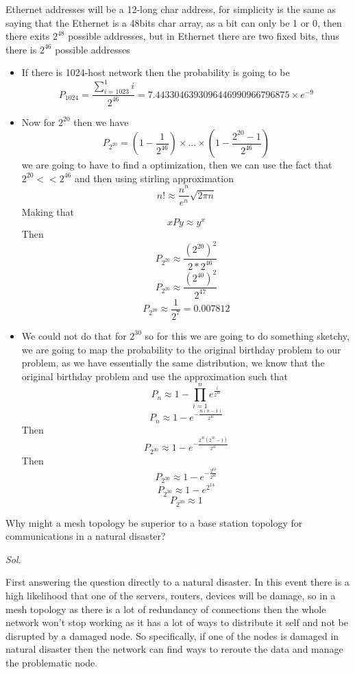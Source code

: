 \documentclass{assignment}
\begin{document}
Ethernet addresses will be a 12-long char address, for simplicity is the same as
saying that the Ethernet is a 48bits char array, as a bit can only be 1 or 0,
then there exits $2^{48}$ possible addresses, but in Ethernet there are two
fixed bits, thus there is $2^{46}$ possible addresses
\begin{itemize}
  \item If there is 1024-host network then the probability is going to be
    $$P_{1024} = \frac{\sum^{1}_{i=1023} i  }{2^{46}} =
    7.4433046393096446990966796875 \times e^{-9}$$

  \item Now for $2^{20}$ then we have
    $$P_{2^{20}} = \left(1-\frac{1}{2^{46}}\right)\times \dots \times
    \left(1-\frac{2^{20}-1}{2^{46}}\right)$$
    we are going to have to find a optimization, then we can use the fact that
    $2^{20} << 2^{46}$ and then using stirling approximation 
  $$n! \approx \frac{n^n}{e^n} \sqrt{2\pi n } $$
  Making that
    $$xPy \approx y^x $$
  Then
    $$P_{2^{20}} \approx \frac{(2^{20})^2}{2*2^{46}} $$
    $$P_{2^{20}} \approx \frac{(2^{40})^2}{2^{47}} $$
    $$P_{2^{20}} \approx \frac{1}{2^{7}} = 0.007812$$
\item We could not do that for $2^{30}$ so for this we are going to do something
  sketchy, we are going to map the probability to the original birthday problem
  to our problem, as we have essentially the same distribution, we know that the
  original birthday problem and use the approximation such that
  $$P_{n} \approx 1-\prod_{i=1}^{n} e^{\frac{i}{2^{46}}}$$
  $$P_{n} \approx 1-e^{-\frac{n(n-1)}{2^{46}}}$$
  Then 
  $$P_{2^{30}} \approx 1-e^{-\frac{2^{30}(2^{30}-1)}{2^{46}}}$$
  Then
  $$P_{2^{30}} \approx 1-e^{-\frac{2^{60}}{2^{46}}}$$
  $$P_{2^{30}} \approx 1-e^{2^{14}}$$
  $$P_{2^{30}} \approx 1$$
\end{itemize}
\newpage
\begin{ex}
Why might a mesh topology be superior to a base station topology for communications in a
natural disaster?
\end{ex}
\textit{ Sol. }

First answering the question directly to a natural disaster. In this event there
is a high likelihood that one of the servers, routers, devices will be damage,
so in a mesh topology as there is a lot of redundancy of connections then the
whole network won't stop working as it has a lot of ways to distribute it self
and not be disrupted by a damaged node.
So specifically, if one of the nodes is damaged in natural disaster then the
network can find ways to reroute the data and manage the problematic node.
\end{document}
